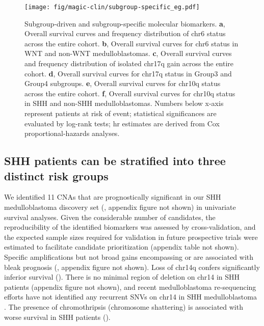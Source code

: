 \begin{figure}[h]
	\begin{center}
		\texttt{[image: fig/magic-clin/subgroup-specific\_eg.pdf]}
	\end{center}
	\caption[Subgroup-driven and subgroup-specific molecular biomarkers]
	{
	Subgroup-driven and subgroup-specific molecular biomarkers.
	\textbf{a}, Overall survival curves and frequency distribution of chr6 status across the entire cohort.
	\textbf{b}, Overall survival curves for chr6 status in WNT and non-WNT medulloblastomas.		
	\textbf{c}, Overall survival curves and frequency distribution of isolated chr17q gain across the entire cohort.
	\textbf{d}, Overall survival curves for chr17q status in Group3 and Group4 subgroups. 
	\textbf{e}, Overall survival curves for chr10q status across the entire cohort.
	\textbf{f}, Overall survival curves for chr10q status in SHH and non-SHH medulloblastomas.
	Numbers below x-axis represent patients at risk of event; statistical significances are evaluated by log-rank tests; \gls{hr} estimates are derived from Cox proportional-hazards analyses.
	}
	\label{fig:subgroup-specific_eg}
\end{figure}

\clearpage

\subsection{SHH patients can be stratified into three distinct risk groups}

We identified 11 CNAs that are prognostically significant in our SHH medulloblastoma discovery set (, appendix figure not shown) in univariate survival analyses. Given the considerable number of candidates, the reproducibility of the identified biomarkers was assessed by cross-validation, and the expected sample sizes required for validation in future prospective trials were estimated to facilitate candidate prioritization (appendix table not shown). Specific amplifications but not broad gains encompassing  or  are associated with bleak prognosis (, appendix figure not shown). Loss of chr14q confers significantly inferior survival (). There is no minimal region of deletion on chr14 in SHH patients (appendix figure not shown), and recent medulloblastoma re-sequencing efforts have not identified any recurrent SNVs on chr14 in SHH medulloblastoma . The presence of chromothripsis (chromosome shattering) is associated with worse survival in SHH patients ().

